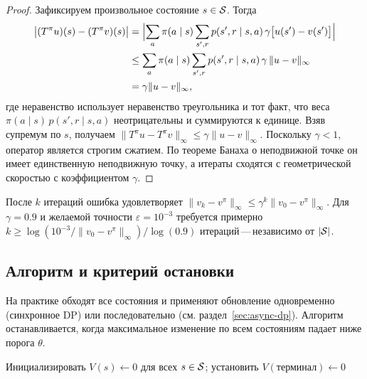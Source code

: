 \begin{proof}
Зафиксируем произвольное состояние $s \in \mathcal{S}$.  Тогда
\begin{align*}
\bigl|(T^\pi u)(s) - (T^\pi v)(s)\bigr|
&= \Bigl|\sum_a \pi(a \mid s) \sum_{s',r} p(s',r \mid s,a)\,\gamma\bigl[u(s') - v(s')\bigr]\Bigr| \\
&\le \sum_a \pi(a \mid s) \sum_{s',r} p(s',r \mid s,a)\,\gamma\,\|u - v\|_\infty \\
&= \gamma \|u - v\|_\infty,
\end{align*}
где неравенство использует неравенство треугольника и тот факт, что веса $\pi(a \mid s)\,p(s',r \mid s,a)$ неотрицательны и суммируются к единице.  Взяв супремум по $s$, получаем $\|T^\pi u - T^\pi v\|_\infty \le \gamma\|u-v\|_\infty$.  Поскольку $\gamma < 1$, оператор является строгим сжатием.  По теореме Банаха о неподвижной точке он имеет единственную неподвижную точку, а итераты сходятся с геометрической скоростью с коэффициентом $\gamma$.
\end{proof}

\begin{remark}
После $k$ итераций ошибка удовлетворяет $\|v_k - v^\pi\|_\infty \le \gamma^k \|v_0 - v^\pi\|_\infty$.  Для $\gamma = 0.9$ и желаемой точности $\varepsilon = 10^{-3}$ требуется примерно $k \ge \log(10^{-3}/\|v_0 - v^\pi\|_\infty)/\log(0.9)$ итераций\,---\,независимо от $|\mathcal{S}|$.
\end{remark}

\subsection*{Алгоритм и критерий остановки}

На практике обходят все состояния и применяют обновление одновременно (синхронное DP) или последовательно (см. раздел~\ref{sec:async-dp}).  Алгоритм останавливается, когда максимальное изменение по всем состояниям падает ниже порога $\theta$.

\begin{algorithm}[ht]
\caption{Итеративная оценка политики}
\label{alg:policy-eval}
Инициализировать $V(s) \leftarrow 0$ для всех $s \in \mathcal{S}$; установить $V(\mbox{терминал}) \leftarrow 0$\;
\end{algorithm}

